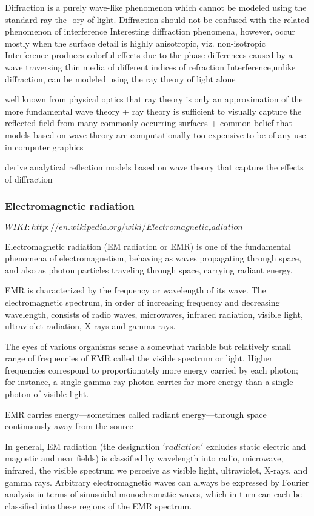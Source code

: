 Diffraction is a purely wave-like phenomenon which cannot be modeled using the standard ray the- ory of light.
Diffraction should not be confused with the related phenomenon of interference
Interesting diffraction phenomena, however, occur mostly when the surface detail is highly anisotropic, viz. non-isotropic
Interference produces colorful effects due to the phase differences caused by a wave traversing thin media of different indices of refraction
Interference,unlike diffraction, can be modeled using the ray theory of light alone

well known from physical optics that ray theory is only an approximation of the more fundamental wave theory
+ ray theory is sufficient to visually capture the reflected field from many commonly occurring surfaces
+ common belief that models based on wave theory are computationally too expensive to be of any use in computer graphics

derive analytical reflection models based on wave theory that capture the effects of diffraction


\subsubsection{Electromagnetic radiation}
$WIKI: http://en.wikipedia.org/wiki/Electromagnetic_radiation$

Electromagnetic radiation (EM radiation or EMR) is one of the fundamental phenomena of electromagnetism, behaving as waves propagating through space, and also as photon particles traveling through space, carrying radiant energy.

EMR is characterized by the frequency or wavelength of its wave. The electromagnetic spectrum, in order of increasing frequency and decreasing wavelength, consists of radio waves, microwaves, infrared radiation, visible light, ultraviolet radiation, X-rays and gamma rays. 

The eyes of various organisms sense a somewhat variable but relatively small range of frequencies of EMR called the visible spectrum or light. Higher frequencies correspond to proportionately more energy carried by each photon; for instance, a single gamma ray photon carries far more energy than a single photon of visible light.

EMR carries energy—sometimes called radiant energy—through space continuously away from the source

In general, EM radiation (the designation $'radiation'$ excludes static electric and magnetic and near fields) is classified by wavelength into radio, microwave, infrared, the visible spectrum we perceive as visible light, ultraviolet, X-rays, and gamma rays. Arbitrary electromagnetic waves can always be expressed by Fourier analysis in terms of sinusoidal monochromatic waves, which in turn can each be classified into these regions of the EMR spectrum.

